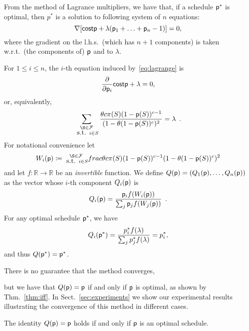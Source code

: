 From the method of Lagrance multipliers, we have that,
if a schedule $\mathsf{p}^*$ is optimal, then $p^*$ is a solution to following system of
$n$ equations:
\begin{equation}\label{eq:lagrange}
	\nabla [\mathsf{cost}{\mathsf{p}} + \lambda (\mathsf{p}_1+\ldots+\mathsf{p}_n-1)] = 0,
\end{equation}
where the gradient on the l.h.s.~(which has $n+1$ components) is taken
w.r.t.~(the components of) $\mathsf{p}$ and to $\lambda$.

For $1\le i\le n$, the $i$-th equation induced by~\eqref{eq:lagrange} is
\[
	\frac{\partial}{\partial \mathsf{p}_i} \mathsf{cost}{\mathsf{p}} + \lambda = 0,
\]
or, equivalently,
\[
	\sum_{\substack{\S\in\family\\\mbox { s.t. } i\in S}} \frac{\theta c \pi(S)
		(1-\sched(S))^{c-1}}{(1-\theta(1-\sched(S))^c)^2} = \lambda\enspace.
\]
For notational convenience let
\[
	W_i(\sched) \defeq\substack{\S\in\family\\\mbox { s.t. } i\in S}
	\\frac{\theta c \pi(S) (1-\sched(S))^{c-1}}{(1-\theta(1-\sched(S))^c)^2}
\]
and let $f: \mathbb{R} \rightarrow \mathbb{R}$ be an \emph{invertible} function.
We define $Q(\mathsf{p}) = (Q_1(\mathsf{p}), \ldots, Q_n(\mathsf{p}))$ as the vector whose
$i$-th component $Q_i(\mathsf{p})$ is
\[
	Q_i(\mathsf{p}) = \frac{\mathsf{p}_i f(W_i(\mathsf{p}))}{\sum_{j} \mathsf{p}_j f(W_j(\mathsf{p}))}\enspace.
\]
For any optimal schedule $\mathsf{p}^*$, we have
\[
	Q_i(\mathsf{p}^*) = \frac{p^*_if(\lambda)}{\sum_j p^*_jf(\lambda)} =
p^*_i,\]
and thus $Q(\mathsf{p}^*) = \mathsf{p}^*$.

There is no guarantee that the method converges,

but we have that $Q(\mathsf{p}) = \mathsf{p}$ if and only if $\mathsf{p}$ is optimal, as shown by
Thm.~\ref{thm:iff}. In Sect.~\ref{sec:experiments} we show our experimental
results illustrating the convergence of this method in different cases.

\begin{theorem}\label{thm:iff}
	The identity $Q(\mathsf{p}) = \mathsf{p}$ holds if and only if $\mathsf{p}$ is an
	optimal schedule.
\end{theorem}

